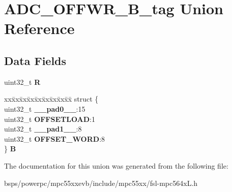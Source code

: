 \hypertarget{unionADC__OFFWR__32B__tag}{}\section{A\+D\+C\+\_\+\+O\+F\+F\+W\+R\+\_\+B\+\_\+tag Union Reference}
\label{unionADC__OFFWR__32B__tag}
\subsection*{Data Fields}
\begin{DoxyCompactItemize}
\item 
\mbox{\label{unionADC__OFFWR__32B__tag_adf3a7266496ef2bcf9db0bed0aa33f59}} 
uint32\+\_\+t {\bfseries R}
\item 
\mbox{\label{unionADC__OFFWR__32B__tag_a87a69c1f094fdf800d45623cb37197c8}} 
\begin{tabbing}
xx\=xx\=xx\=xx\=xx\=xx\=xx\=xx\=xx\=\kill
struct \{\\
\>uint32\_t {\bfseries \_\_pad0\_\_}:15\\
\>uint32\_t {\bfseries OFFSETLOAD}:1\\
\>uint32\_t {\bfseries \_\_pad1\_\_}:8\\
\>uint32\_t {\bfseries OFFSET\_WORD}:8\\
\} {\bfseries B}\\

\end{tabbing}\end{DoxyCompactItemize}


The documentation for this union was generated from the following file\+:\begin{DoxyCompactItemize}
\item 
bsps/powerpc/mpc55xxevb/include/mpc55xx/fsl-\/mpc564x\+L.\+h\end{DoxyCompactItemize}
